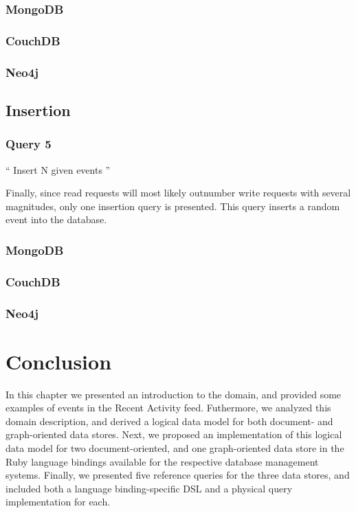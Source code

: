 \subsubsection*{MongoDB}
\subsubsection*{CouchDB}
\subsubsection*{Neo4j}

\subsection{Insertion}
\label{subsec:insertion}

\subsubsection{Query 5}
\label{subsubsec:query-5}

``
Insert N given events
''

Finally, since read requests will most likely outnumber write requests with several magnitudes, only one insertion query is presented.
This query inserts a random event into the database.

\subsubsection*{MongoDB}
\subsubsection*{CouchDB}
\subsubsection*{Neo4j}

\section{Conclusion}
\label{sec:data-model-conclusion}

In this chapter we presented an introduction to the domain, and provided some examples of events in the Recent Activity feed.
Futhermore, we analyzed this domain description, and derived a logical data model for both document- and graph-oriented data stores.
Next, we proposed an implementation of this logical data model for two document-oriented, and one graph-oriented data store in the Ruby language bindings available for the respective database management systems.
Finally, we presented five reference queries for the three data stores, and included both a language binding-specific DSL and a physical query implementation for each.
